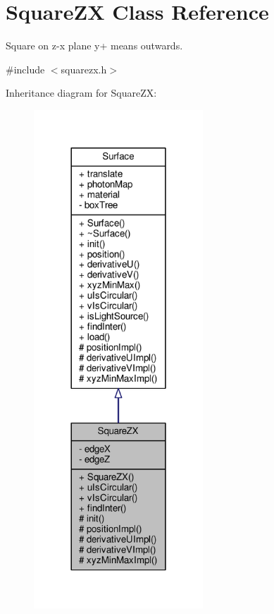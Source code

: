 \hypertarget{classSquareZX}{}\section{Square\+ZX Class Reference}
\label{classSquareZX}


Square on z-\/x plane y+ means outwards.  




{\ttfamily \#include $<$squarezx.\+h$>$}



Inheritance diagram for Square\+ZX\+:\nopagebreak
\begin{figure}[H]
\begin{center}
\leavevmode
\includegraphics[width=180pt]{classSquareZX__inherit__graph}
\end{center}
\end{figure}



